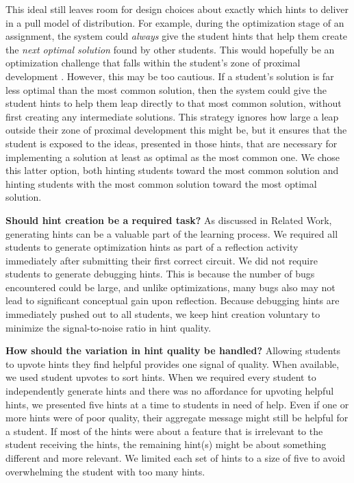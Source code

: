 This ideal still leaves room for design choices about exactly which hints to deliver in a pull model of distribution. For example, during the optimization stage of an assignment, the system could \textit{always} give the student hints that help them create the \textit{next optimal solution} found by other students. This would hopefully be an optimization challenge that falls within the student's zone of proximal development \cite{ZMP}. However, this may be too cautious. If a student's solution is far less optimal than the most common solution, then the system could give the student hints to help them leap directly to that most common solution, without first creating any intermediate solutions. This strategy ignores how large a leap outside their zone of proximal development this might be, but it ensures that the student is exposed to the ideas, presented in those hints, that are necessary for implementing a solution at least as optimal as the most common one. We chose this latter option, both hinting students toward the most common solution and hinting students with the most common solution toward the most optimal solution.

{\bf Should hint creation be a required task?} As discussed in Related Work, generating hints can be a valuable part of the learning process. We required all students to generate optimization hints as part of a reflection activity immediately after submitting their first correct circuit. We did not require students to generate debugging hints. This is because the number of bugs encountered could be large, and unlike optimizations, many bugs also may not lead to significant conceptual gain upon reflection. Because debugging hints are immediately pushed out to all students, we keep hint creation voluntary to minimize the signal-to-noise ratio in hint quality.

{\bf How should the variation in hint quality be handled?} Allowing students to upvote hints they find helpful provides one signal of quality. When available, we used student upvotes to sort hints. When we required every student to independently generate hints and there was no affordance for upvoting helpful hints, we presented five hints at a time to students in need of help. Even if one or more hints were of poor quality, their aggregate message might still be helpful for a student. If most of the hints were about a feature that is irrelevant to the student receiving the hints, the remaining hint(s) might be about something different and more relevant. We limited each set of hints to a size of five to avoid overwhelming the student with too many hints.

